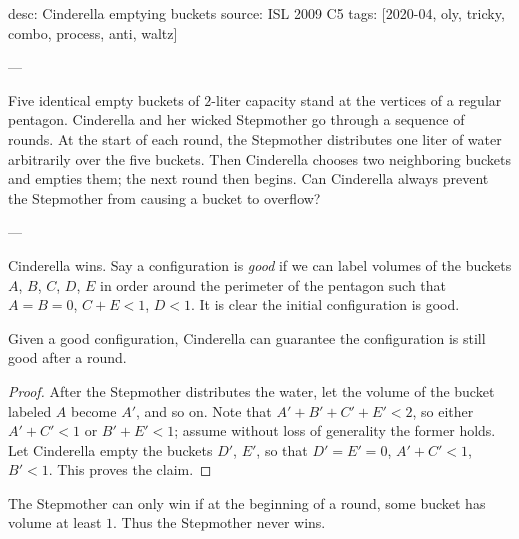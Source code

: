 desc: Cinderella emptying buckets
source: ISL 2009 C5
tags: [2020-04, oly, tricky, combo, process, anti, waltz]

---

Five identical empty buckets of $2$-liter capacity stand at the vertices of a regular pentagon. Cinderella and her wicked Stepmother go through a sequence of rounds. At the start of each round, the Stepmother distributes one liter of water arbitrarily over the five buckets. Then Cinderella chooses two neighboring buckets and empties them; the next round then begins. Can Cinderella always prevent the Stepmother from causing a bucket to overflow?

---

Cinderella wins. Say a configuration is \emph{good} if we can label volumes of the buckets $A$, $B$, $C$, $D$, $E$ in order around the perimeter of the pentagon such that $A=B=0$, $C+E<1$, $D<1$. It is clear the initial configuration is good.
\begin{claim*}
Given a good configuration, Cinderella can guarantee the configuration is still good after a round.
\end{claim*}
\begin{proof}
    After the Stepmother distributes the water, let the volume of the bucket labeled $A$ become $A'$, and so on. Note that $A'+B'+C'+E'<2$, so either $A'+C'<1$ or $B'+E'<1$; assume without loss of generality the former holds. Let Cinderella empty the buckets $D'$, $E'$, so that $D'=E'=0$, $A'+C'<1$, $B'<1$. This proves the claim.
\end{proof}

The Stepmother can only win if at the beginning of a round, some bucket has volume at least $1$. Thus the Stepmother never wins.
